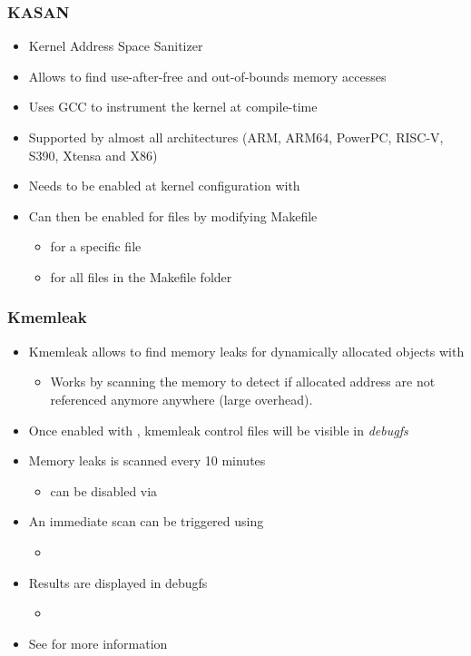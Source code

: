 \begin{frame}
  \frametitle{KASAN}
  \begin{itemize}
    \item Kernel Address Space Sanitizer
    \item Allows to find use-after-free and out-of-bounds memory accesses
    \item Uses GCC to instrument the kernel at compile-time
    \item Supported by almost all architectures (ARM, ARM64, PowerPC, RISC-V,
          S390, Xtensa and X86)
    \item Needs to be enabled at kernel configuration with
    \item Can then be enabled for files by modifying Makefile
    \begin{itemize}
      \item {} for a specific file
      \item {} for all files in the Makefile folder
    \end{itemize}
  \end{itemize}
\end{frame}

\begin{frame}
  \frametitle{Kmemleak}
  \begin{itemize}
    \item Kmemleak allows to find memory leaks for dynamically allocated objects
          with 
    \begin{itemize}
      \item Works by scanning the memory to detect if allocated address are not
            referenced anymore anywhere (large overhead).
    \end{itemize}
    \item Once enabled with , kmemleak control
          files will be visible in {\em debugfs}
    \item Memory leaks is scanned every 10 minutes
    \begin{itemize}
      \item can be disabled via 
    \end{itemize}
    \item An immediate scan can be triggered using 
    \begin{itemize}
      \item {}
    \end{itemize}
    \item Results are displayed in debugfs
    \begin{itemize}
      \item {}
    \end{itemize}
    \item See  for more information
  \end{itemize}
\end{frame}

